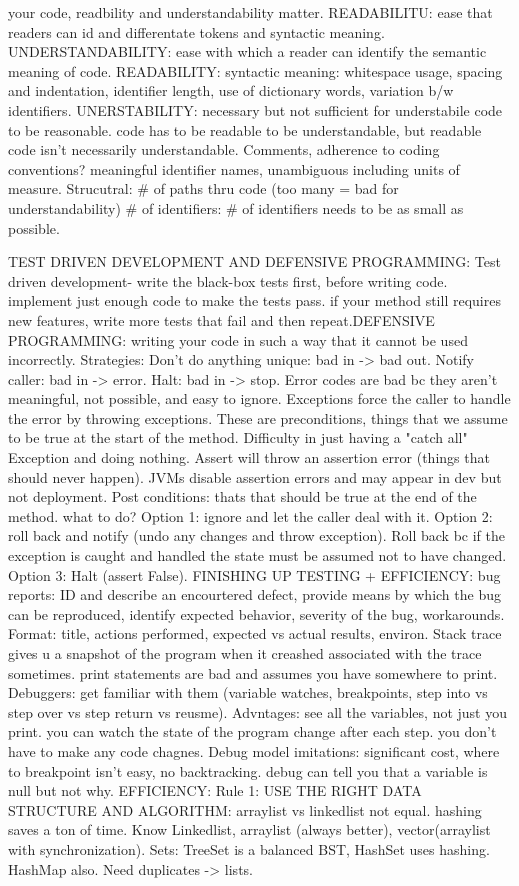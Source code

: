 \documentclass[10pt]{article}
\begin{document}
\begin{landscape}
\begin{multicols*}{6}
your code, readbility and understandability matter. READABILITU: ease that readers can id and differentate tokens and syntactic meaning. UNDERSTANDABILITY: ease with which a reader can identify the semantic meaning of code. READABILITY: syntactic meaning: whitespace usage, spacing and indentation, identifier length, use of dictionary words, variation b/w identifiers. UNERSTABILITY: necessary but not sufficient for understabile code to be reasonable. code has to be readable to be understandable, but readable code isn't necessarily understandable. Comments, adherence to coding conventions? meaningful identifier names, unambiguous including units of measure. Strucutral: \# of paths thru code (too many = bad for understandability) \# of identifiers: \# of identifiers needs to be as small as possible. 

TEST DRIVEN DEVELOPMENT AND DEFENSIVE PROGRAMMING: Test driven development- write the black-box tests first, before writing code. implement just enough code to make the tests pass. if your method still requires new features, write more tests that fail and then repeat.DEFENSIVE PROGRAMMING: writing your code in such a way that it cannot be used incorrectly. Strategies: Don't do anything unique: bad in -> bad out. Notify caller: bad in -> error. Halt: bad in -> stop. Error codes are bad bc they aren't meaningful, not possible, and easy to ignore. Exceptions force the caller to handle the error by throwing exceptions. These are preconditions, things that we assume to be true at the start of the method. Difficulty in just having a "catch all" Exception and doing nothing. Assert will throw an assertion error (things that should never happen). JVMs disable assertion errors and may appear in dev but not deployment. Post conditions: thats that should be true at the end of the method. what to do? Option 1: ignore and let the caller deal with it. Option 2: roll back and notify (undo any changes and throw exception). Roll back bc if the exception is caught and handled the state must be assumed not to have changed. Option 3: Halt (assert False). FINISHING UP TESTING + EFFICIENCY: bug reports: ID and describe an encourtered defect, provide means by which the bug can be reproduced, identify expected behavior, severity of the bug, workarounds. Format: title, actions performed, expected vs actual results, environ. Stack trace gives u a snapshot of the program when it creashed associated with the trace sometimes. print statements are bad and assumes you have somewhere to print. Debuggers: get familiar with them (variable watches, breakpoints, step into vs step over vs step return vs reusme). Advntages: see all the variables, not just you print. you can watch the state of the program change after each step. you don't have to make any code chagnes. Debug model imitations: significant cost, where to breakpoint isn't easy, no backtracking. debug can tell you that a variable is null but not why. EFFICIENCY: Rule 1: USE THE RIGHT DATA STRUCTURE AND ALGORITHM: arraylist vs linkedlist not equal. hashing saves a ton of time. Know Linkedlist, arraylist (always better), vector(arraylist with synchronization). Sets: TreeSet is a balanced BST, HashSet uses hashing. HashMap also. Need duplicates -> lists. 
\end{multicols*}
\end{landscape}
\end{document}
